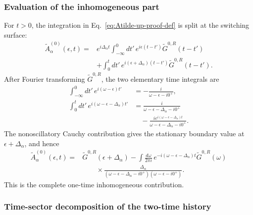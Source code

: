 \documentclass[
 reprint,
 superscriptaddress,
 amsmath,amssymb,
 aps,prb,
 longbibliography,
 floatfix
]{revtex4-2}
\begin{document}
\subsubsection{Evaluation of the inhomogeneous part}

For $t>0$, the integration in Eq.~\eqref{eq:Atilde-up-proof-def} is split at the switching surface:
\begin{align*}
\widetilde A_\alpha^{(0)}(\epsilon,t)
={}&
e^{i\Delta_\alpha t}
\int_{-\infty}^{0}dt'\,
e^{i\epsilon(t-t')}
\widetilde G^{0,R}(t-t')
\\
&+
\int_0^t dt'\,
e^{i(\epsilon+\Delta_\alpha)(t-t')}
\widetilde G^{0,R}(t-t').
\end{align*}
After Fourier transforming $\widetilde G^{0,R}$, the two elementary time integrals are
\begin{align*}
\int_{-\infty}^{0}dt'\,
e^{i(\omega-\epsilon)t'}
&=
-\frac{i}{\omega-\epsilon-i0^+},
\\
\int_0^t dt'\,
e^{i(\omega-\epsilon-\Delta_\alpha)t'}
&=
\frac{i}
{\omega-\epsilon-\Delta_\alpha-i0^+}
\\
&\quad-
\frac{
i e^{i(\omega-\epsilon-\Delta_\alpha)t}}
{\omega-\epsilon-\Delta_\alpha-i0^+}.
\end{align*}
The nonoscillatory Cauchy contribution gives the stationary boundary value at $\epsilon+\Delta_\alpha$, and hence
\begin{equation*}
\begin{aligned}
\widetilde A_\alpha^{(0)}(\epsilon,t)
={}&
\widetilde G^{0,R}(\epsilon+\Delta_\alpha)
-
\int\frac{d\omega}{2\pi i}\,
e^{-i(\omega-\epsilon-\Delta_\alpha)t}
\widetilde G^{0,R}(\omega)
\\
&\qquad\times
\frac{\Delta_\alpha}
{
(\omega-\epsilon-\Delta_\alpha-i0^+)
(\omega-\epsilon-i0^+)
}.
\end{aligned}
\end{equation*}
This is the complete one-time inhomogeneous contribution.

\subsubsection{Time-sector decomposition of the two-time history}
\end{document}

